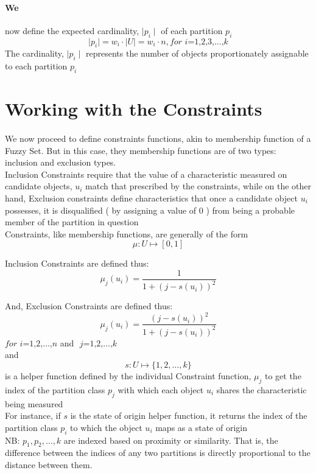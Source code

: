 \documentclass[a4paper,openany]{book}
\begin{document}
			\paragraph{We}
				now define the expected cardinality, $\mid p_i \mid$ of each partition $p_i$
				\begin{equation}
					\mid p_i \mid = w_i \cdot \mid U \mid = w_i \cdot n, \textit{for i=1,2,3,}\dots\text{,}k
				\end{equation}
				The cardinality, $\mid p_i \mid$ represents the number of objects proportionately assignable to each partition $p_i$
		\section{Working with the Constraints}
			\paragraph{}
				We now proceed to define constraints functions, akin to membership function of a Fuzzy Set. But in this case, they membership functions are of two types: inclusion and exclusion types.\\
				Inclusion Constraints require that the value of a characteristic measured on candidate objects, $u_i$ match that prescribed by the constraints, while on the other hand, Exclusion constraints define characteristics that once a candidate object $u_i$ possesses, it is disqualified ( by assigning a value of 0 ) from being a probable member of the partition in question\\
				Constraints, like membership functions, are generally of the form
				\[
					\mu \colon U \mapsto [ 0,1 ]
				\]
				
				Inclusion Constraints are defined thus:
				\begin{equation}
					\mu_j(u_i) = \frac{1}{1+\left( j - s(u_i) \right)^2}
				\end{equation}
				
				And, Exclusion Constraints are defined thus:
				\begin{equation}
					\mu_j(u_i) = \frac{\left( j - s(u_i) \right)^2}{1+\left( j - s(u_i) \right)^2}
				\end{equation}
				$\textit{for i=1,2,}\dots\text{,}n$ and $\textit{ j=1,2,}\dots\text{,}k$\\
				and
				\begin{equation}
					s\colon U\mapsto \{ 1,2,\dots,k \}
				\end{equation}
				is a helper function defined by the individual Constraint function, $\mu_j$ to get the index of the partition class $p_j$ with which each object $u_i$ shares the characteristic being measured\\
				For instance, if $s$ is the state of origin helper function, it returns the index of the partition class $p_i$ to which the object $u_i$ maps as a state of origin\\
				NB: $p_1, p_2,\dots,k$ are indexed based on proximity or similarity. That is, the difference between the indices of any two partitions is directly proportional to the distance between them.
\end{document}
